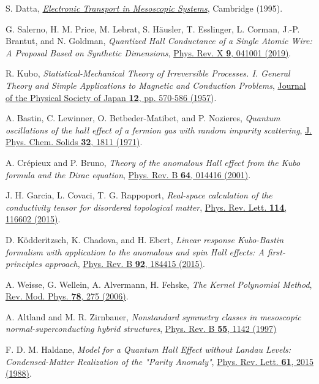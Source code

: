 \documentclass[aps,prb,amsmath,amssymb,twocolumn, superscriptaddress]{revtex4-2}
\begin{document}
\begin{thebibliography}{10}
S. Datta, \href{https://www.cambridge.org/core/books/electronic-transport-in-mesoscopic-systems/1E55DEF5978AA7B843FF70337C220D8B}{\em Electronic Transport in Mesoscopic Systems}, Cambridge (1995).

G. Salerno, H. M. Price, M. Lebrat, S. Häusler, T. Esslinger, L. Corman, J.-P. Brantut, and N. Goldman, {\em Quantized Hall Conductance of a Single Atomic Wire: A Proposal Based on Synthetic Dimensions}, \href{https://journals.aps.org/prx/abstract/10.1103/PhysRevX.9.041001}{Phys. Rev. X {\bfseries 9}, 041001 (2019)}.

R. Kubo, {\em Statistical-Mechanical Theory of Irreversible Processes. I. General Theory and Simple Applications to Magnetic and Conduction Problems}, \href{https://journals.jps.jp/doi/10.1143/JPSJ.12.570}{Journal of the Physical Society of Japan {\bfseries 12}, pp. 570-586 (1957)}.

A. Bastin, C. Lewinner, O. Betbeder-Matibet, and P.
Nozieres, {\em Quantum oscillations of the hall effect of a fermion gas with random impurity scattering}, \href{https://www.sciencedirect.com/science/article/pii/S0022369771801476}{ J. Phys. Chem. Solids {\bfseries 32}, 1811 (1971)}.

A. Cr\'epieux and P. Bruno, {\em Theory of the anomalous Hall effect from the Kubo formula and the Dirac equation}, \href{https://journals.aps.org/prb/abstract/10.1103/PhysRevB.64.014416}{Phys. Rev. B {\bfseries 64}, 014416 (2001)}.

J. H. Garcia, L.  Covaci, T. G. Rappoport, {\em Real-space calculation of the conductivity tensor for disordered topological matter}, \href{https://journals.aps.org/prl/abstract/10.1103/PhysRevLett.114.116602}{Phys. Rev. Lett. {\bfseries 114}, 116602 (2015)}.

D. Ködderitzsch, K. Chadova, and H. Ebert, {\em Linear response Kubo-Bastin formalism with application to the anomalous and spin Hall effects: A first-principles approach}, \href{https://journals.aps.org/prb/abstract/10.1103/PhysRevB.92.184415}{Phys. Rev. B {\bfseries 92}, 184415 (2015)}.

A. Weisse, G. Wellein, A. Alvermann, H. Fehske, {\em The Kernel Polynomial Method}, \href{https://journals.aps.org/rmp/abstract/10.1103/RevModPhys.78.275}{Rev. Mod. Phys. {\bfseries 78}, 275 (2006)}.

A. Altland and M. R. Zirnbauer, {\em Nonstandard symmetry classes in mesoscopic normal-superconducting hybrid structures}, \href{https://journals.aps.org/prb/abstract/10.1103/PhysRevB.55.1142}{Phys. Rev. B {\bfseries 55}, 1142 (1997)}

F. D. M. Haldane, {\em Model for a Quantum Hall Effect without Landau Levels: Condensed-Matter Realization of the "Parity Anomaly"}, \href{https://journals.aps.org/prl/abstract/10.1103/PhysRevLett.61.2015}{Phys. Rev. Lett. {\bfseries 61}, 2015 (1988)}.

\end{thebibliography}
\end{document}
